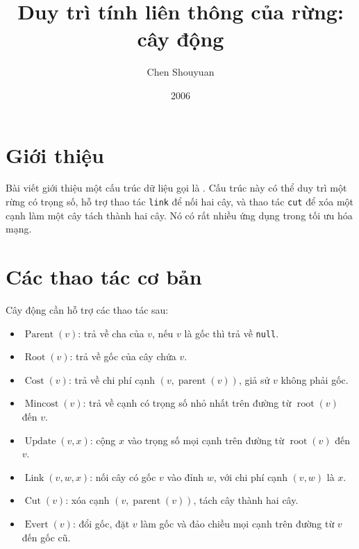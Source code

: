 \documentclass[11pt]{article}
\title{Duy trì tính liên thông của rừng: cây động}
\author{Chen Shouyuan}
\date{2006}
\begin{document}
\maketitle


\section{Giới thiệu}

Bài viết giới thiệu một cấu trúc dữ liệu gọi là . Cấu trúc này
có thể duy trì một rừng có trọng số, hỗ trợ thao tác \texttt{link} để nối hai
cây, và thao tác \texttt{cut} để xóa một cạnh làm một cây tách thành hai cây.
Nó có rất nhiều ứng dụng trong tối ưu hóa mạng.

\section{Các thao tác cơ bản}

Cây động cần hỗ trợ các thao tác sau:

\begin{itemize}
  \item \(\operatorname{Parent}(v)\): trả về cha của \(v\), nếu \(v\) là gốc
  thì trả về \texttt{null}.
  \item \(\operatorname{Root}(v)\): trả về gốc của cây chứa \(v\).
  \item \(\operatorname{Cost}(v)\): trả về chi phí cạnh
  \((v,\operatorname{parent}(v))\), giả sử \(v\) không phải gốc.
  \item \(\operatorname{Mincost}(v)\): trả về cạnh có trọng số nhỏ nhất trên
  đường từ \(\operatorname{root}(v)\) đến \(v\).
  \item \(\operatorname{Update}(v,x)\): cộng \(x\) vào trọng số mọi cạnh trên
  đường từ \(\operatorname{root}(v)\) đến \(v\).
  \item \(\operatorname{Link}(v,w,x)\): nối cây có gốc \(v\) vào đỉnh \(w\),
  với chi phí cạnh \((v,w)\) là \(x\).
  \item \(\operatorname{Cut}(v)\): xóa cạnh
  \((v,\operatorname{parent}(v))\), tách cây thành hai cây.
  \item \(\operatorname{Evert}(v)\): đổi gốc, đặt \(v\) làm gốc và đảo chiều
  mọi cạnh trên đường từ \(v\) đến gốc cũ.
\end{itemize}
\end{document}

